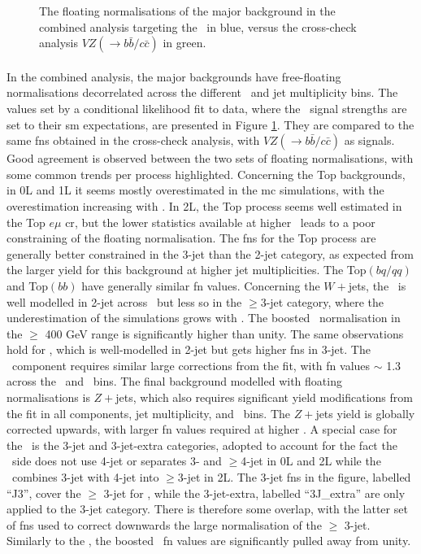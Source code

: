 \begin{figure}[h!]
    \caption{The floating normalisations of the major background in the combined analysis targeting the \vhbc\ in blue, versus the cross-check analysis $VZ(\rightarrow b\bar{b}/c\bar{c})$ in green.}
    \label{fig:FNback}
\end{figure} 

\paragraph{}In the combined analysis, the major backgrounds have free-floating normalisations decorrelated across the different \ptv\ and jet multiplicity bins. The values set by a conditional likelihood fit to data, where the \vhbc\ signal strengths are set to their \gls{sm} expectations, are presented in Figure \ref{fig:FNback}. They are compared to the same \glspl{fn} obtained in the cross-check analysis, with $VZ(\rightarrow b\bar{b}/c\bar{c})$ as signals. Good agreement is observed between the two sets of floating normalisations, with some common trends per process highlighted. Concerning the Top backgrounds, in 0L and 1L it seems mostly overestimated in the \gls{mc} simulations, with the overestimation increasing with \ptv. In 2L, the Top process seems well estimated in the Top $e\mu$ \gls{cr}, but the lower statistics available at higher \ptv\ leads to a poor constraining of the floating normalisation. The \glspl{fn} for the Top process are generally better constrained in the 3-jet than the 2-jet category, as expected from the larger yield for this background at higher jet multiplicities. The Top$(bq/qq)$ and Top$(bb)$ have generally similar \gls{fn} values. Concerning the $W+$jets, the \whf\ is well modelled in 2-jet across \ptv\ but less so in the $\geq$3-jet category, where the underestimation of the simulations grows with \ptv. The boosted \whf\ normalisation in the $\geq$ 400 GeV range is significantly higher than unity. The same observations hold for \wlf, which is well-modelled in 2-jet but gets higher \glspl{fn} in 3-jet. The \wmf\ component requires similar large corrections from the fit, with \gls{fn} values $\sim$ 1.3 across the \nj\ and \ptv\ bins. The final background modelled with floating normalisations is $Z+$jets, which also requires significant yield modifications from the fit in all components, jet multiplicity, and \ptv\ bins. The $Z+$jets yield is globally corrected upwards, with larger \gls{fn} values required at higher \ptv. A special case for the \zhf\ is the 3-jet and 3-jet-extra categories, adopted to account for the fact the \vhc\ side does not use 4-jet or separates 3- and $\geq$4-jet in 0L and 2L while the \vhb\ combines 3-jet with 4-jet into $\geq$3-jet in 2L. The 3-jet \glspl{fn} in the figure, labelled ``J3'', cover the $\geq$ 3-jet for \vhb, while the 3-jet-extra, labelled ``3J\_extra'' are only applied to the 3-jet category. There is therefore some overlap, with the latter set of \glspl{fn} used to correct downwards the large normalisation of the $\geq$ 3-jet. Similarly to the \whf, the boosted \zhf\ \gls{fn} values are significantly pulled away from unity.
  
